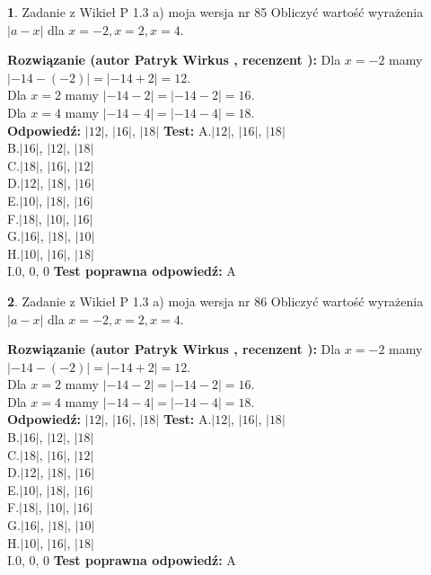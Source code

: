 \documentclass[12pt, a4paper]{article}
\theoremstyle{definition} %
\newtheorem{zad}{}
\newcommand{\zadStart}[1]{\begin{zad}#1\newline}
\newcommand{\zadStop}{\end{zad}}
\newcommand{\rozwStart}[2]{\noindent \textbf{Rozwiązanie (autor #1 , recenzent #2): }\newline}
\newcommand{\rozwStop}{\newline}
\newcommand{\odpStart}{\noindent \textbf{Odpowiedź:}\newline}
\newcommand{\odpStop}{\newline}
\newcommand{\testStart}{\noindent \textbf{Test:}\newline}
\newcommand{\testStop}{\newline}
\newcommand{\kluczStart}{\noindent \textbf{Test poprawna odpowiedź:}\newline}
\newcommand{\kluczStop}{\newline}
\begin{document}
\zadStart{Zadanie z Wikieł P 1.3 a) moja wersja nr 85}
Obliczyć wartość wyrażenia $|a - x|$ dla $x=-2,x=2,x=4$.
\zadStop
\rozwStart{Patryk Wirkus}{}
Dla $x = -2$ mamy $|-14 - (-2)| = |-14 + 2| = 12$.\\
Dla $x = 2$ mamy $|-14 - 2| = |-14 - 2| = 16$.\\
Dla $x = 4$ mamy $|-14 - 4| = |-14 - 4| = 18$.\\
\rozwStop
\odpStart
$|12|$, $|16|$, $|18|$
\odpStop
\testStart
A.$|12|$, $|16|$, $|18|$\\
B.$|16|$, $|12|$, $|18|$\\
C.$|18|$, $|16|$, $|12|$\\
D.$|12|$, $|18|$, $|16|$\\
E.$|10|$, $|18|$, $|16|$\\
F.$|18|$, $|10|$, $|16|$\\
G.$|16|$, $|18|$, $|10|$\\
H.$|10|$, $|16|$, $|18|$\\
I.$0$, $0$, $0$
\testStop
\kluczStart
A
\kluczStop



\zadStart{Zadanie z Wikieł P 1.3 a) moja wersja nr 86}
Obliczyć wartość wyrażenia $|a - x|$ dla $x=-2,x=2,x=4$.
\zadStop
\rozwStart{Patryk Wirkus}{}
Dla $x = -2$ mamy $|-14 - (-2)| = |-14 + 2| = 12$.\\
Dla $x = 2$ mamy $|-14 - 2| = |-14 - 2| = 16$.\\
Dla $x = 4$ mamy $|-14 - 4| = |-14 - 4| = 18$.\\
\rozwStop
\odpStart
$|12|$, $|16|$, $|18|$
\odpStop
\testStart
A.$|12|$, $|16|$, $|18|$\\
B.$|16|$, $|12|$, $|18|$\\
C.$|18|$, $|16|$, $|12|$\\
D.$|12|$, $|18|$, $|16|$\\
E.$|10|$, $|18|$, $|16|$\\
F.$|18|$, $|10|$, $|16|$\\
G.$|16|$, $|18|$, $|10|$\\
H.$|10|$, $|16|$, $|18|$\\
I.$0$, $0$, $0$
\testStop
\kluczStart
A
\kluczStop
\end{document}
